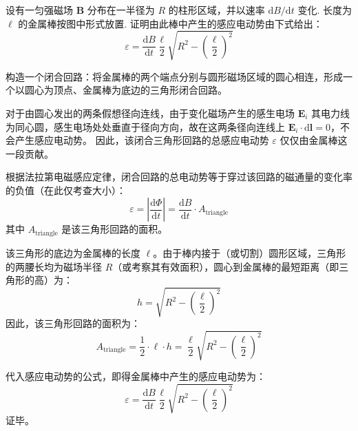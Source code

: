 \begin{exercise}\label{ex:18.2}
设有一匀强磁场 $\boldsymbol{B}$ 分布在一半径为 $R$ 的柱形区域，并以速率 $\mathrm{d}B/\mathrm{d}t$ 变化. 长度为 $\ell$ 的金属棒按图中形式放置. 证明由此棒中产生的感应电动势由下式给出：
$$ \varepsilon = \frac{\mathrm{d}B}{\mathrm{d}t} \frac{\ell}{2} \sqrt{R^2 - \left(\frac{\ell}{2}\right)^2} $$
\begin{center}
\end{center}
\end{exercise}
\begin{solution}
构造一个闭合回路：将金属棒的两个端点分别与圆形磁场区域的圆心相连，形成一个以圆心为顶点、金属棒为底边的三角形闭合回路。

对于由圆心发出的两条假想径向连线，由于变化磁场产生的感生电场 $\boldsymbol{E}_i$ 其电力线为同心圆，感生电场处处垂直于径向方向，故在这两条径向连线上 $\boldsymbol{E}_i \cdot \mathrm{d}\boldsymbol{l} = 0$，不会产生感应电动势。
因此，该闭合三角形回路的总感应电动势 $\varepsilon$ 仅仅由金属棒这一段贡献。

根据法拉第电磁感应定律，闭合回路的总电动势等于穿过该回路的磁通量的变化率的负值（在此仅考查大小）：
$$ \varepsilon = \left| \frac{\mathrm{d}\Phi}{\mathrm{d}t} \right| = \frac{\mathrm{d}B}{\mathrm{d}t} \cdot A_{\text{triangle}} $$
其中 $A_{\text{triangle}}$ 是该三角形回路的面积。

该三角形的底边为金属棒的长度 $\ell$。由于棒内接于（或切割）圆形区域，三角形的两腰长均为磁场半径 $R$（或考察其有效面积），圆心到金属棒的最短距离（即三角形的高）为：
$$ h = \sqrt{R^2 - \left(\frac{\ell}{2}\right)^2} $$
因此，该三角形回路的面积为：
$$ A_{\text{triangle}} = \frac{1}{2} \cdot \ell \cdot h = \frac{\ell}{2} \sqrt{R^2 - \left(\frac{\ell}{2}\right)^2} $$

代入感应电动势的公式，即得金属棒中产生的感应电动势为：
$$ \varepsilon = \frac{\mathrm{d}B}{\mathrm{d}t} \frac{\ell}{2} \sqrt{R^2 - \left(\frac{\ell}{2}\right)^2} $$
证毕。
\end{solution}

